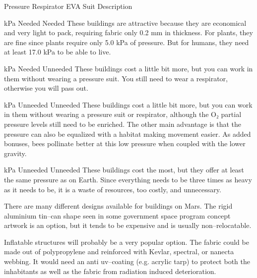 \crlf
\crlf
{}
{
    \bTABLE[split=repeat,option=stretch]
    \setupTABLE[column][4][
        width=.50\textwidth,
        align=yes]
    \setupTABLE[row][each][align=center]
    \setupTABLE[4][1][align=center]

    \bTABLEhead
    \bTR[bottomframe=on]
      \bTH  Pressure \eTH
      \bTH  Respirator \eTH
      \bTH  EVA Suit \eTH
      \bTH  Description \eTH
    \eTR
    \eTABLEhead

    \bTABLEbody
    \bTR
       kPa \eTC
      \bTC Needed \eTC
      \bTC Needed \eTC
      \bTC These buildings are attractive because they are economical and very light to pack, requiring fabric only 0.2 mm in thickness. For plants, they are fine since plants require only 5.0 kPa of pressure. But for humans, they need at least 17.0 kPa to be able to live. \eTC
    \eTR

    \bTR
       kPa \eTC
      \bTC Needed \eTC
      \bTC Unneeded \eTC
      \bTC These buildings cost a little bit more, but you can work in them without wearing a pressure suit. You still need to wear a respirator, otherwise you will pass out. \eTC
    \eTR

    \bTR
       kPa \eTC
      \bTC Unneeded \eTC
      \bTC Unneeded \eTC
      \bTC These buildings cost a little bit more, but you can work in them without wearing a pressure suit or respirator, although the O₂ partial pressure levels still need to be enriched. The other main advantage is that the pressure can also be equalized with a habitat making movement easier. As added bonuses, bees pollinate better at this low pressure when coupled with the lower gravity. \eTC
    \eTR

    \bTR
       kPa \eTC
      \bTC Unneeded \eTC
      \bTC Unneeded \eTC
      \bTC These buildings cost the most, but they offer at least the same pressure as on Earth. Since everything needs to be three times as heavy as it needs to be, it is a waste of resources, too costly, and unnecessary. \eTC
    \eTR
    \eTABLEbody

\eTABLE
}

There are many different designs available for buildings on Mars. The rigid aluminium tin--can shape seen in some government space program concept artwork is an option, but it tends to be expensive and is usually non--relocatable.

Inflatable structures will probably be a very popular option. The fabric could be made out of polypropylene and reinforced with Kevlar\high{\registered}, spectral, or nanecta webbing. It would need an anti uv--coating (e.g. acrylic tarp) to protect both the inhabitants as well as the fabric from radiation induced deterioration. 

